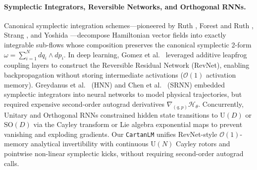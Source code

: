 \documentclass[11pt,a4paper]{article}
\begin{document}
\paragraph{Symplectic Integrators, Reversible Networks, and Orthogonal RNNs.}
Canonical symplectic integration schemes---pioneered by Ruth \cite{ruth1983canonical}, Forest and Ruth \cite{forest1990fourth}, Strang \cite{strang1968construction}, and Yoshida \cite{yoshida1990construction}---decompose Hamiltonian vector fields into exactly integrable sub-flows whose composition preserves the canonical symplectic 2-form $\omega = \sum_{i=1}^N dq_i \wedge dp_i$. In deep learning, Gomez et al.\ \cite{gomez2017reversible} leveraged additive leapfrog coupling layers to construct the Reversible Residual Network (RevNet), enabling backpropagation without storing intermediate activations ($\mathcal{O}(1)$ activation memory). Greydanus et al.\ \cite{greydanus2019hamiltonian} (HNN) and Chen et al.\ \cite{chen2020symplectic} (SRNN) embedded symplectic integrators into neural networks to model physical trajectories, but required expensive second-order autograd derivatives $\nabla_{(q,p)}\mathcal{H}_\theta$. Concurrently, Unitary and Orthogonal RNNs \cite{arjovsky2016unitary,helfrich2018orthogonal,lezcanocasado2019cheap,lezcanocasado2019trivializations} constrained hidden state transitions to $\mathrm{U}(D)$ or $\mathrm{SO}(D)$ via the Cayley transform or Lie algebra exponential maps to prevent vanishing and exploding gradients. Our \texttt{CartanLM} unifies RevNet-style $\mathcal{O}(1)$-memory analytical invertibility with continuous $\mathrm{U}(N)$ Cayley rotors and pointwise non-linear symplectic kicks, without requiring second-order autograd calls.
\end{document}
